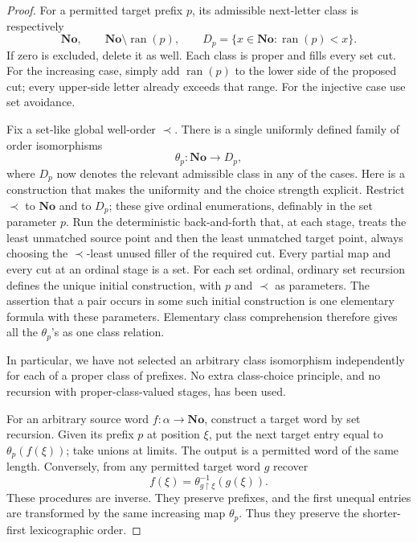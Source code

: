 \documentclass[11pt]{article}
\theoremstyle{definition}
\theoremstyle{remark}
\newcommand{\No}{\mathbf{No}}
\begin{document}
\begin{proof}
For a permitted target prefix \(p\), its admissible next-letter
class is respectively
\[
 \No,\qquad
 \No\setminus\operatorname{ran}(p),\qquad
 D_p=\{x\in\No:\operatorname{ran}(p)<x\}.
\]
If zero is excluded, delete it as well.  Each class is proper and
fills every set cut.  For the increasing case, simply add
\(\operatorname{ran}(p)\) to the lower side of the proposed cut;
every upper-side letter already exceeds that range.  For the
injective case use set avoidance.

Fix a set-like global well-order \(\prec\).  There is a single
uniformly defined family of order isomorphisms
\[
                    \theta_p:\No\longrightarrow D_p,
\]
where \(D_p\) now denotes the relevant admissible class in any of
the cases.  Here is a construction that makes the uniformity and
the choice strength explicit.  Restrict \(\prec\) to \(\No\)
and to \(D_p\); these give ordinal enumerations, definably in
the set parameter \(p\).  Run the deterministic back-and-forth
that, at each stage, treats the least unmatched source point and
then the least unmatched target point, always choosing the
\(\prec\)-least unused filler of the required cut.  Every partial
map and every cut at an ordinal stage is a set.  For each set
ordinal, ordinary set recursion defines the unique initial
construction, with \(p\) and \(\prec\) as parameters.  The
assertion that a pair occurs in some such initial construction
is one elementary formula with these parameters.  Elementary
class comprehension therefore gives all the \(\theta_p\)'s as
one class relation.

In particular, we have not selected an arbitrary class
isomorphism independently for each of a proper class of prefixes.
No extra class-choice principle, and no recursion with
proper-class-valued stages, has been used.

For an arbitrary source word \(f:\alpha\to\No\), construct a
target word by set recursion.  Given its prefix \(p\) at position
\(\xi\), put the next target entry equal to
\(\theta_p(f(\xi))\); take unions at limits.  The output is a
permitted word of the same length.  Conversely, from any permitted
target word \(g\) recover
\[
              f(\xi)=\theta_{g\restriction\xi}^{-1}(g(\xi)).
\]
These procedures are inverse.  They preserve prefixes, and the
first unequal entries are transformed by the same increasing
map \(\theta_p\).  Thus they preserve the shorter-first
lexicographic order.


\end{proof}
\end{document}
